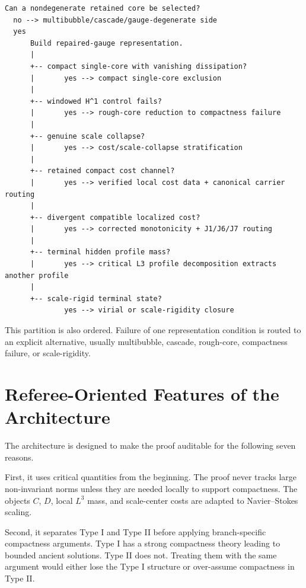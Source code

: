 \documentclass[11pt]{amsart}
\begin{document}
\begin{center}
\begin{minipage}{0.92\linewidth}
\scriptsize
\begin{verbatim}
Can a nondegenerate retained core be selected?
  no --> multibubble/cascade/gauge-degenerate side
  yes
      Build repaired-gauge representation.
      |
      +-- compact single-core with vanishing dissipation?
      |       yes --> compact single-core exclusion
      |
      +-- windowed H^1 control fails?
      |       yes --> rough-core reduction to compactness failure
      |
      +-- genuine scale collapse?
      |       yes --> cost/scale-collapse stratification
      |
      +-- retained compact cost channel?
      |       yes --> verified local cost data + canonical carrier routing
      |
      +-- divergent compatible localized cost?
      |       yes --> corrected monotonicity + J1/J6/J7 routing
      |
      +-- terminal hidden profile mass?
      |       yes --> critical L3 profile decomposition extracts another profile
      |
      +-- scale-rigid terminal state?
              yes --> virial or scale-rigidity closure
\end{verbatim}
\end{minipage}
\end{center}

This partition is also ordered.  Failure of one representation condition is routed to an explicit alternative, usually multibubble, cascade, rough-core, compactness failure, or scale-rigidity.

\section{Referee-Oriented Features of the Architecture}

The architecture is designed to make the proof auditable for the following seven reasons.

First, it uses critical quantities from the beginning.  The proof never tracks large non-invariant norms unless they are needed locally to support compactness. The objects \(C\), \(D\), local \(L^3\) mass, and scale-center costs are adapted to Navier--Stokes scaling.

Second, it separates Type I and Type II before applying branch-specific compactness arguments.  Type I has a strong compactness theory leading to bounded ancient solutions.  Type II does not.  Treating them with the same argument would either lose the Type I structure or over-assume compactness in Type II.
\end{document}
